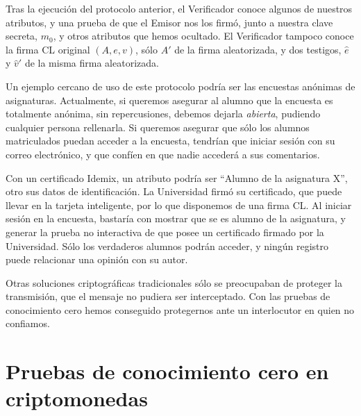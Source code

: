 Tras la ejecución del protocolo anterior, el Verificador conoce algunos de nuestros atributos, y una prueba de que el Emisor nos los firmó, junto a nuestra clave secreta, $m_0$, y otros atributos que hemos ocultado. El Verificador tampoco conoce la firma CL original $(A,e,v)$, sólo $A'$ de la firma aleatorizada, y dos testigos, $\hat{e}$ y $\hat{v}'$ de la misma firma aleatorizada.

Un ejemplo cercano de uso de este protocolo podría ser las encuestas anónimas de asignaturas. Actualmente, si queremos asegurar al alumno que la encuesta es totalmente anónima, sin repercusiones, debemos dejarla \textit{abierta}, pudiendo cualquier persona rellenarla. Si queremos asegurar que sólo los alumnos matriculados puedan acceder a la encuesta, tendrían que iniciar sesión con su correo electrónico, y que confíen en que nadie accederá a sus comentarios.

Con un certificado Idemix, un atributo podría ser ``Alumno de la asignatura X'', otro sus datos de identificación. La Universidad firmó su certificado, que puede llevar en la tarjeta inteligente, por lo que disponemos de una firma CL. Al iniciar sesión en la encuesta, bastaría con mostrar que se es alumno de la asignatura, y generar la prueba no interactiva de que posee un certificado firmado por la Universidad. Sólo los verdaderos alumnos podrán acceder, y ningún registro puede relacionar una opinión con su autor.

Otras soluciones criptográficas tradicionales sólo se preocupaban de proteger la transmisión, que el mensaje no pudiera ser interceptado. Con las pruebas de conocimiento cero hemos conseguido protegernos ante un interlocutor en quien no confiamos.


\section{Pruebas de conocimiento cero en criptomonedas}





